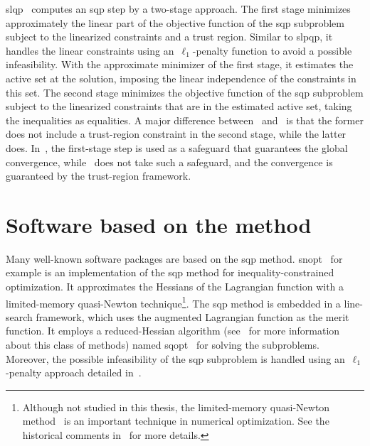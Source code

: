 \Gls{slqp}~\cite{Fletcher_Maza_1989,Byrd_Etal_2004} computes an \gls{sqp} step by a two-stage approach.
The first stage minimizes approximately the linear part of the objective function of the \gls{sqp} subproblem subject to the linearized constraints and a trust region.
Similar to \gls{slpqp}, it handles the linear constraints using an~$\ell_1$-penalty function to avoid a possible infeasibility.
With the approximate minimizer of the first stage, it estimates the active set at the solution, imposing the linear independence of the constraints in this set.
The second stage minimizes the objective function of the \gls{sqp} subproblem subject to the linearized constraints that are in the estimated active set, taking the inequalities as equalities.
A major difference between~\cite{Fletcher_Maza_1989} and~\cite{Byrd_Etal_2004} is that the former does not include a trust-region constraint in the second stage, while the latter does.
In~\cite{Fletcher_Maza_1989}, the first-stage step is used as a safeguard that guarantees the global convergence, while~\cite{Byrd_Etal_2004} does not take such a safeguard, and the convergence is guaranteed by the trust-region framework.

\section{Software based on the  method}
\label{sec:existing-sqp-software}

Many well-known software packages are based on the \gls{sqp} method.
\Gls{snopt}~\cite{Gill_Murray_Saunders_2002,Gill_Murray_Saunders_2005} for example is an implementation of the \gls{sqp} method for inequality-constrained optimization.
It approximates the Hessians of the Lagrangian function with a limited-memory quasi-Newton technique\footnote{Although not studied in this thesis, the limited-memory quasi-Newton method~\cite{Perry_1977,Shanno_1978} is an important technique in numerical optimization. See the historical comments in~\cite[\S~1, \P~3]{Liu_Nocedal_1989} for more details.}.
The \gls{sqp} method is embedded in a line-search framework, which uses the augmented Lagrangian function as the merit function.
It employs a reduced-Hessian algorithm (see~\cite{Byrd_Nocedal_1991} for more information about this class of methods) named \gls{sqopt}~\cite{Gill_Murray_Saunders_2008} for solving the subproblems.
Moreover, the possible infeasibility of the \gls{sqp} subproblem is handled using an~$\ell_1$-penalty approach detailed in~\cite[\S~1.2]{Gill_Murray_Saunders_2005}.


